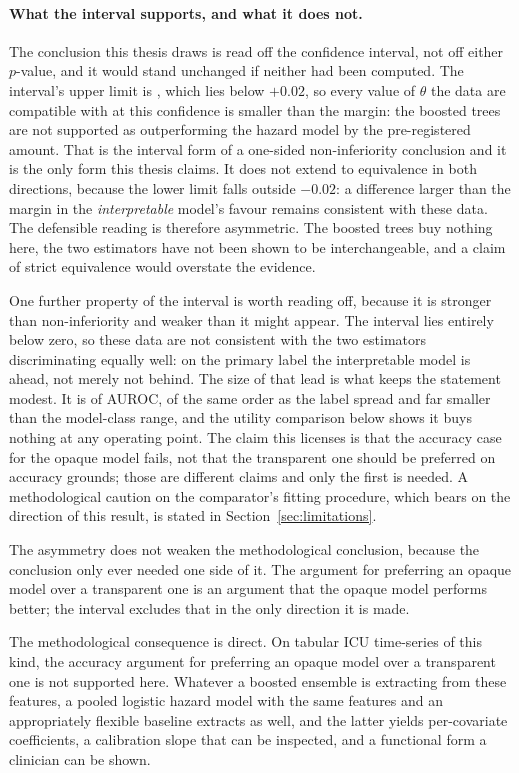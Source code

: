 \paragraph{What the interval supports, and what it does not.} The conclusion
this thesis draws is read off the confidence interval, not off either
$p$-value, and it would stand unchanged if neither had been computed. The
interval's upper limit is \pcHSixCiHi, which lies below $+0.02$, so every
value of $\theta$ the data are compatible with at this confidence is smaller
than the margin: the boosted trees are not supported as outperforming the
hazard model by the pre-registered amount. That is the interval form of a
one-sided non-inferiority conclusion and it is the only form this thesis
claims. It does not extend to equivalence in both directions, because the lower
limit \pcHSixCiLo{} falls outside $-0.02$: a difference larger than the margin
in the \emph{interpretable} model's favour remains consistent with these data.
The defensible reading is therefore asymmetric. The boosted trees buy nothing
here, the two estimators have not been shown to be interchangeable, and a claim
of strict equivalence would overstate the evidence.

One further property of the interval is worth reading off, because it is
stronger than non-inferiority and weaker than it might appear. The interval
lies entirely below zero, so these data are not consistent with the two
estimators discriminating equally well: on the primary label the interpretable
model is ahead, not merely not behind. The size of that lead is what keeps the
statement modest. It is \pcHSixEst{} of AUROC, of the same order as the label
spread and far smaller than the model-class range, and the utility comparison
below shows it buys nothing at any operating point. The claim this licenses is that
the accuracy case for the opaque model fails, not that the transparent one
should be preferred on accuracy grounds; those are different claims and only
the first is needed. A methodological caution on the comparator's fitting
procedure, which bears on the direction of this result, is stated in
Section~\ref{sec:limitations}.

The asymmetry does not weaken the methodological conclusion, because the
conclusion only ever needed one side of it. The argument for preferring an
opaque model over a transparent one is an argument that the opaque model
performs better; the interval excludes that in the only direction it is made.

The methodological consequence is direct. On tabular ICU time-series of this
kind, the accuracy argument for preferring an opaque model over a transparent
one is not supported here. Whatever a boosted ensemble is extracting from these
features, a pooled logistic hazard model with the same features and an
appropriately flexible baseline extracts as well, and the latter yields
per-covariate coefficients, a calibration slope that can be inspected, and a
functional form a clinician can be shown.

